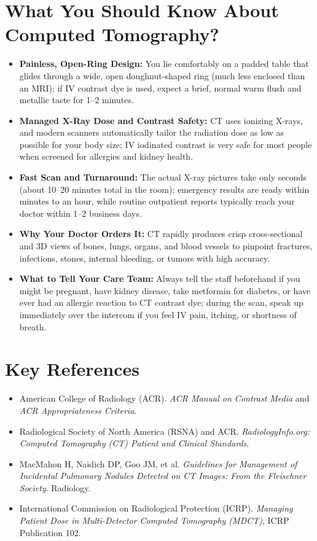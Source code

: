 \section{What You Should Know About Computed Tomography?}
\begin{itemize}
    \item \textbf{Painless, Open-Ring Design:} You lie comfortably on a padded table that glides through a wide, open doughnut-shaped ring (much less enclosed than an MRI); if IV contrast dye is used, expect a brief, normal warm flush and metallic taste for 1--2 minutes.
    \item \textbf{Managed X-Ray Dose and Contrast Safety:} CT uses ionizing X-rays, and modern scanners automatically tailor the radiation dose as low as possible for your body size; IV iodinated contrast is very safe for most people when screened for allergies and kidney health.
    \item \textbf{Fast Scan and Turnaround:} The actual X-ray pictures take only seconds (about 10--20 minutes total in the room); emergency results are ready within minutes to an hour, while routine outpatient reports typically reach your doctor within 1--2 business days.
    \item \textbf{Why Your Doctor Orders It:} CT rapidly produces crisp cross-sectional and 3D views of bones, lungs, organs, and blood vessels to pinpoint fractures, infections, stones, internal bleeding, or tumors with high accuracy.
    \item \textbf{What to Tell Your Care Team:} Always tell the staff beforehand if you might be pregnant, have kidney disease, take metformin for diabetes, or have ever had an allergic reaction to CT contrast dye; during the scan, speak up immediately over the intercom if you feel IV pain, itching, or shortness of breath.
\end{itemize}

\section{Key References}
\begin{itemize}
    \item American College of Radiology (ACR). \textit{ACR Manual on Contrast Media} and \textit{ACR Appropriateness Criteria}.
    \item Radiological Society of North America (RSNA) and ACR. \textit{RadiologyInfo.org: Computed Tomography (CT) Patient and Clinical Standards}.
    \item MacMahon H, Naidich DP, Goo JM, et al. \textit{Guidelines for Management of Incidental Pulmonary Nodules Detected on CT Images: From the Fleischner Society}. Radiology.
    \item International Commission on Radiological Protection (ICRP). \textit{Managing Patient Dose in Multi-Detector Computed Tomography (MDCT)}, ICRP Publication 102.
\end{itemize}
